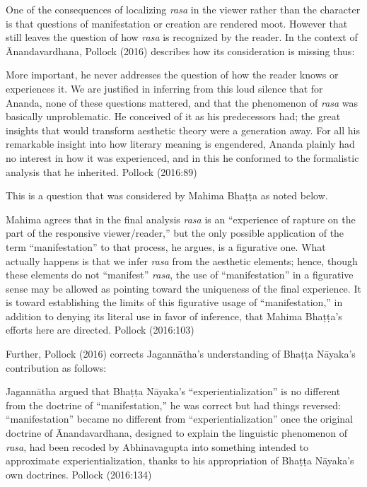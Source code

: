 One of the consequences of localizing \textsl{rasa} in the viewer rather than the character is that questions of manifestation or creation are rendered moot. However that still leaves the question of how \textsl{rasa} is recognized by the reader. In the context of Ānandavardhana, Pollock (2016) describes how its consideration is missing thus: 

\begin{myquote}
More important, he never addresses the question of how the reader knows or experiences it. We are justified in inferring from this loud silence that for Ananda, none of these questions mattered, and that the phenomenon of \textsl{rasa} was basically unproblematic. He conceived of it as his predecessors had; the great insights that would transform aesthetic theory were a generation away. For all his remarkable insight into how literary meaning is engendered, Ananda plainly had no interest in how it was experienced, and in this he conformed to the formalistic analysis that he inherited.
\hfill Pollock (2016:89)
\end{myquote}

This is a question that was considered by Mahima Bhaṭṭa as noted below.

\begin{myquote}
Mahima agrees that in the final analysis \textsl{rasa} is an “experience of rapture on the part of the responsive viewer/reader,” but the only possible application of the term “manifestation” to that process, he argues, is a figurative one. What actually happens is that we infer \textsl{rasa} from the aesthetic elements; hence, though these elements do not “manifest” \textsl{rasa}, the use of “manifestation” in a figurative sense may be allowed as pointing toward the uniqueness of the final experience. It is toward establishing the limits of this figurative usage of “manifestation,” in addition to denying its literal use in favor of inference, that Mahima Bhaṭṭa’s efforts here are directed.
\hfill Pollock (2016:103)
\end{myquote}

Further, Pollock (2016) corrects Jagannātha’s understanding of Bhaṭṭa Nāyaka’s contribution as follows:

\begin{myquote}
Jagannātha argued that Bhaṭṭa Nāyaka’s “experientialization” is no different from the doctrine of “manifestation,” he was correct but had things reversed: “manifestation” became no different from “experientialization” once the original doctrine of Ānandavardhana, designed to explain the linguistic phenomenon of \textsl{rasa}, had been recoded by Abhinavagupta into something intended to approximate experientialization, thanks to his appropriation of Bhaṭṭa Nāyaka’s own doctrines.
\hfill Pollock (2016:134)
\end{myquote}

